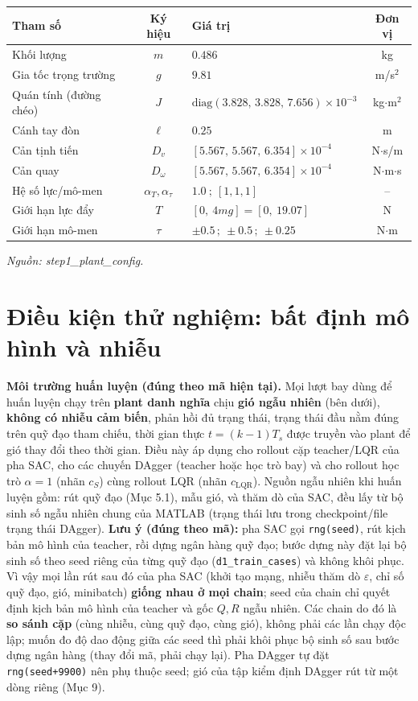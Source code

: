 \documentclass[11pt]{article}
\newcommand{\cS}{c_{S}}
\newcommand{\cL}{c_{\mathrm{LQR}}}
\begin{document}
\begin{center}\small
\begin{tabular}{@{}p{5.2cm} c p{6.2cm} c@{}}
\toprule
\textbf{Tham số} & \textbf{Ký hiệu} & \textbf{Giá trị} & \textbf{Đơn vị}\\
\midrule
Khối lượng & $m$ & $0.486$ & kg\\
Gia tốc trọng trường & $g$ & $9.81$ & m/s$^2$\\
Quán tính (đường chéo) & $J$ & $\mathrm{diag}(3.828,\,3.828,\,7.656)\times 10^{-3}$ & kg$\cdot$m$^2$\\
Cánh tay đòn & $\ell$ & $0.25$ & m\\
Cản tịnh tiến & $D_v$ & $[5.567,\,5.567,\,6.354]\times 10^{-4}$ & N$\cdot$s/m\\
Cản quay & $D_\omega$ & $[5.567,\,5.567,\,6.354]\times 10^{-4}$ & N$\cdot$m$\cdot$s\\
Hệ số lực/mô-men & $\alpha_T,\alpha_\tau$ & $1.0\ ;\ [1,1,1]$ & --\\
Giới hạn lực đẩy & $T$ & $[0,\ 4mg]=[0,\ 19.07]$ & N\\
Giới hạn mô-men & $\tau$ & $\pm0.5\,;\ \pm0.5\,;\ \pm0.25$ & N$\cdot$m\\
\bottomrule
\end{tabular}
\end{center}
{\small\itshape Nguồn: step1\_plant\_config.}

\section{Điều kiện thử nghiệm: bất định mô hình và nhiễu}
\textbf{Môi trường huấn luyện (đúng theo mã hiện tại).} Mọi lượt bay dùng để huấn luyện chạy trên
\textbf{plant danh nghĩa} chịu \textbf{gió ngẫu nhiên} (bên dưới), \textbf{không có nhiễu cảm biến}, phản hồi
đủ trạng thái, trạng thái đầu nằm đúng trên quỹ đạo tham chiếu, thời gian thực $t=(k-1)T_s$ được truyền
vào plant để gió thay đổi theo thời gian. Điều này áp dụng cho rollout cặp teacher/LQR của pha SAC, cho các
chuyến DAgger (teacher hoặc học trò bay) và cho rollout học trò $\alpha=1$ (nhãn $\cS$) cùng rollout LQR (nhãn
$\cL$). Nguồn ngẫu nhiên khi huấn luyện gồm: rút quỹ đạo (Mục 5.1), mẫu gió, và thăm dò của SAC, đều lấy từ bộ
sinh số ngẫu nhiên chung của MATLAB (trạng thái lưu trong checkpoint/file trạng thái DAgger). \textbf{Lưu ý (đúng
theo mã):} pha SAC gọi \texttt{rng(seed)}, rút kịch bản mô hình của teacher, rồi dựng ngân hàng quỹ đạo; bước dựng
này đặt lại bộ sinh số theo seed riêng của từng quỹ đạo (\texttt{d1\_train\_cases}) và không khôi phục. Vì vậy mọi
lần rút sau đó của pha SAC (khởi tạo mạng, nhiễu thăm dò $\varepsilon$, chỉ số quỹ đạo, gió, minibatch)
\textbf{giống nhau ở mọi chain}; seed của chain chỉ quyết định kịch bản mô hình của teacher và gốc $Q,R$ ngẫu
nhiên. Các chain do đó là \textbf{so sánh cặp} (cùng nhiễu, cùng quỹ đạo, cùng gió), không phải các lần chạy độc
lập; muốn đo độ dao động giữa các seed thì phải khôi phục bộ sinh số sau bước dựng ngân hàng (thay đổi mã, phải
chạy lại). Pha DAgger tự đặt \texttt{rng(seed+9900)} nên phụ thuộc seed; gió của tập kiểm định DAgger rút từ
một dòng riêng (Mục 9).
\end{document}
